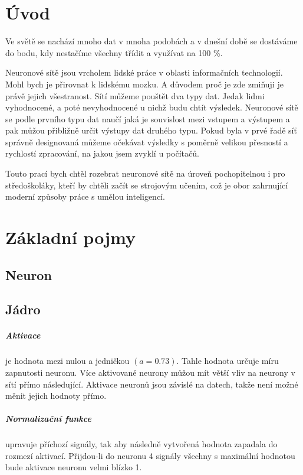 \documentclass[12pt,a4paper]{report}
\begin{document}


\tableofcontents

\chapter{Úvod}
Ve světě se nachází mnoho dat v mnoha podobách a v dnešní době se dostáváme do bodu, kdy nestačíme všechny třídit a využívat na 100 \%.

Neuronové sítě jsou vrcholem lidské práce v oblasti informačních technologií. Mohl bych je přirovnat k lidskému mozku. A důvodem proč je zde zmiňuji je právě jejich všestranost. Sítí můžeme pouštět dva typy dat. Jedak lidmi vyhodnocené, a poté nevyhodnocené u nichž budu chtít výsledek. Neuronové sítě se podle prvního typu dat naučí jaká je souvislost mezi vstupem a výstupem a pak můžou přibližně určit výstupy dat druhého typu. Pokud byla v prvé řadě síť správně designovaná můžeme očekávat výsledky s poměrně velikou přesností a rychlostí zpracování, na jakou jsem zvyklí u počítačů.

Touto prací bych chtěl rozebrat neuronové sítě na úroveň pochopitelnou i pro středoškoláky, kteří by chtěli začít se strojovým učením, což je obor zahrnující moderní způsoby práce s umělou inteligencí.


\chapter{Základní pojmy} %

\section{Neuron}

	\section{Jádro}
		\paragraph{Aktivace}
		je hodnota mezi nulou a jedničkou $(a=0.73)$. Tahle hodnota určuje míru zapnutosti neuronu. Více aktivované neurony můžou mít větší vliv na neurony v sítí přímo následující. Aktivace neuronů jsou závislé na datech, takže není možné měnit jejich hodnoty přímo.
		\paragraph{Normalizační funkce}
		upravuje příchozí signály, tak aby následně vytvořená hodnota zapadala do rozmezí aktivací. Přijdou-li do neuronu 4 signály všechny s maximální hodnotou bude aktivace neuronu velmi blízko 1.
\end{document}
